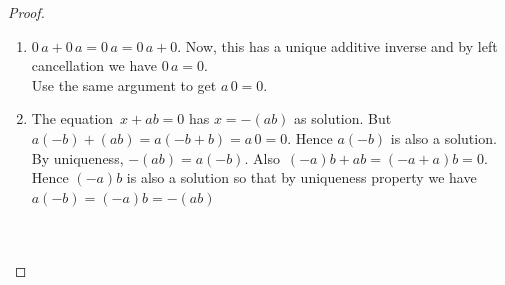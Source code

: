 \documentclass[11pt,a4paper]{article}
\theoremstyle{definition}
\begin{document}
\begin{proof}
\begin{enumerate}
\item $0\, a + 0\, a = 0\, a = 0\, a + 0$. Now, this has a unique additive inverse and by left cancellation we have $0\, a = 0$.\\
Use the same argument to get $a\, 0  = 0$.\\

\item The equation $\, x + ab = 0$ has $x = - (ab)$ as solution. But $a(-b) + (ab) = a(-b + b) = a\, 0 = 0$. Hence $a(-b)$ is also a solution. By uniqueness, $-(ab) = a(-b)$. Also $\, (-a) b + ab = (-a + a) b = 0$. Hence $(-a)b$ is also a solution so that by uniqueness property we have $a(-b) = (-a)b = -(ab)$\\\\\\









\end{enumerate}
\end{proof}
\end{document}
